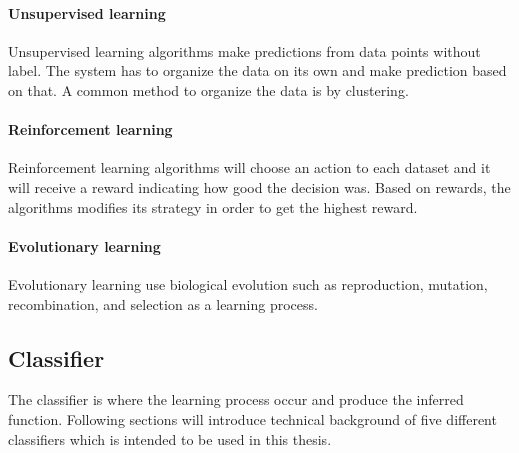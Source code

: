 \documentclass[USenglish]{ifimaster}  %
\begin{document}
\paragraph{Unsupervised learning}
Unsupervised learning algorithms make predictions from data points without label. The system has to organize the data on its own and make prediction based on that. A common method to organize the data is by clustering.
	
\paragraph{Reinforcement learning}
Reinforcement learning algorithms will choose an action to each dataset and it will receive a reward indicating how good the decision was. Based on rewards, the algorithms modifies its strategy in order to get the highest reward. 
	
\paragraph{Evolutionary learning}
Evolutionary learning use biological evolution such as reproduction, mutation, recombination, and selection as a learning process. 
	
\subsection{Classifier} \label{sub:classifier}
The classifier is where the learning process occur and produce the inferred function. Following sections will introduce technical background of five different classifiers which is intended to be used in this thesis.
	
\end{document}
